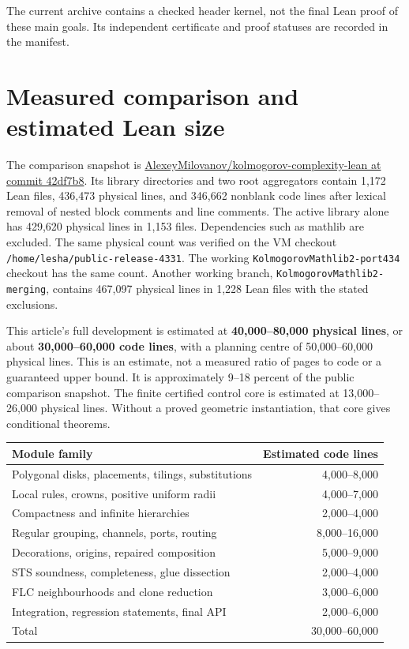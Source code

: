 \documentclass[11pt,a4paper]{article}
\theoremstyle{remark}
\begin{document}
The current archive contains a checked header kernel, not the final Lean
proof of these main goals. Its independent certificate and proof statuses
are recorded in the manifest.

\section{Measured comparison and estimated Lean size}

The comparison snapshot is
\href{https://github.com/AlexeyMilovanov/kolmogorov-complexity-lean/tree/42df7b843d6727291dfd0cbc1ceb299723ce5cb6}
{AlexeyMilovanov/kolmogorov-complexity-lean at commit 42df7b8}.
Its library directories and two root aggregators contain 1,172 Lean files,
436,473 physical lines, and 346,662 nonblank code lines after lexical
removal of nested block comments and line comments.
The active library alone has 429,620 physical lines in 1,153 files.
Dependencies such as mathlib are excluded. The same physical count was
verified on the VM checkout \texttt{/home/lesha/public-release-4331}.
The working \texttt{KolmogorovMathlib2-port434} checkout has the same count.
Another working branch, \texttt{KolmogorovMathlib2-merging}, contains 467,097
physical lines in 1,228 Lean files with the stated exclusions.

This article's full development is estimated at \textbf{40,000--80,000
physical lines}, or about \textbf{30,000--60,000 code lines}, with a planning
centre of 50,000--60,000 physical lines. This is an estimate, not a measured
ratio of pages to code or a guaranteed upper bound. It is approximately
9--18 percent of the public comparison snapshot. The finite certified
control core is estimated at 13,000--26,000 physical lines. Without a
proved geometric instantiation, that core gives conditional theorems.

\begin{center}
\begin{tabular}{lr}
Module family & Estimated code lines\\ \hline
Polygonal disks, placements, tilings, substitutions & 4,000--8,000\\
Local rules, crowns, positive uniform radii & 4,000--7,000\\
Compactness and infinite hierarchies & 2,000--4,000\\
Regular grouping, channels, ports, routing & 8,000--16,000\\
Decorations, origins, repaired composition & 5,000--9,000\\
STS soundness, completeness, glue dissection & 2,000--4,000\\
FLC neighbourhoods and clone reduction & 3,000--6,000\\
Integration, regression statements, final API & 2,000--6,000\\ \hline
Total & 30,000--60,000
\end{tabular}
\end{center}
\end{document}
